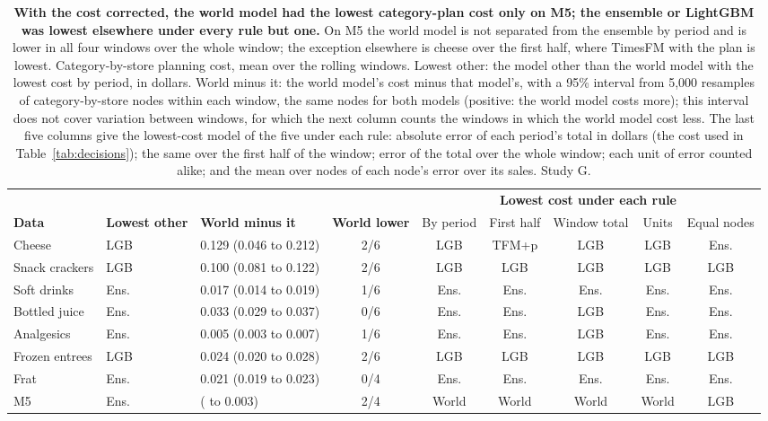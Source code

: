 \begin{table}[t]
\centering
\caption{\textbf{With the cost corrected, the world model had the lowest category-plan cost only on M5; the
ensemble or LightGBM was lowest elsewhere under every rule but one.} On M5 the world model is not separated from the
ensemble by period and is lower in all four windows over the whole window; the exception elsewhere is cheese over the
first half, where TimesFM with the plan is lowest.
Category-by-store planning cost, mean over the rolling windows. Lowest other: the model other than the world model with
the lowest cost by period, in dollars. World minus it: the world model's cost minus that model's, with a 95\% interval
from 5,000 resamples of category-by-store nodes within each window, the same nodes for both models (positive: the
world model costs more); this interval does not cover variation between windows, for which the next column counts the
windows in which the world model cost less. The last five columns give the lowest-cost model of the five under each
rule: absolute error of each period's total in dollars (the cost used in Table~\ref{tab:decisions}); the same over
the first half of the window; error of the total over the whole window; each unit of error counted alike; and the mean
over nodes of each node's error over its sales. Study G.}
\label{tab:catcost}
\footnotesize
\setlength{\tabcolsep}{3.4pt}
\begin{tabular}{lllc*{5}{c}}
\toprule
 & & & & \multicolumn{5}{c}{\textbf{Lowest cost under each rule}} \\
\cmidrule(l){5-9}
\textbf{Data} & \textbf{Lowest other} & \textbf{World minus it} & \textbf{World lower} & By period & First half & Window total & Units & Equal nodes \\
\midrule
Cheese & LGB & 0.129 (0.046 to 0.212) & 2/6 & LGB & TFM+p & LGB & LGB & Ens. \\
Snack crackers & LGB & 0.100 (0.081 to 0.122) & 2/6 & LGB & LGB & LGB & LGB & LGB \\
Soft drinks & Ens. & 0.017 (0.014 to 0.019) & 1/6 & Ens. & Ens. & Ens. & Ens. & Ens. \\
Bottled juice & Ens. & 0.033 (0.029 to 0.037) & 0/6 & Ens. & Ens. & LGB & Ens. & Ens. \\
Analgesics & Ens. & 0.005 (0.003 to 0.007) & 1/6 & Ens. & Ens. & LGB & Ens. & Ens. \\
Frozen entrees & LGB & 0.024 (0.020 to 0.028) & 2/6 & LGB & LGB & LGB & LGB & LGB \\
Frat & Ens. & 0.021 (0.019 to 0.023) & 0/4 & Ens. & Ens. & Ens. & Ens. & Ens. \\
M5 & Ens. & \textminus 0.002 (\textminus 0.006 to 0.003) & 2/4 & World & World & World & World & LGB \\
\bottomrule
\end{tabular}
\end{table}
